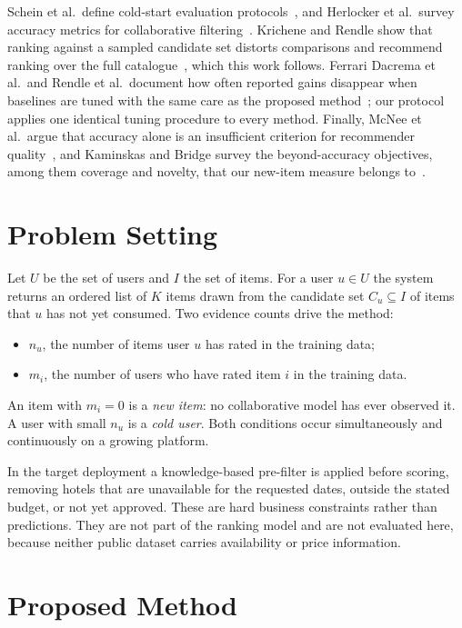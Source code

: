 \documentclass[runningheads]{llncs}
\begin{document}
Schein et al.\ define cold-start evaluation protocols~\cite{schein2002}, and Herlocker et al.\ survey accuracy metrics for collaborative filtering~\cite{herlocker2004}. Krichene and Rendle show that ranking against a sampled candidate set distorts comparisons and recommend ranking over the full catalogue~\cite{krichene2020}, which this work follows. Ferrari Dacrema et al.\ and Rendle et al.\ document how often reported gains disappear when baselines are tuned with the same care as the proposed method~\cite{dacrema2019,rendle2020}; our protocol applies one identical tuning procedure to every method. Finally, McNee et al.\ argue that accuracy alone is an insufficient criterion for recommender quality~\cite{mcnee2006}, and Kaminskas and Bridge survey the beyond-accuracy objectives, among them coverage and novelty, that our new-item measure belongs to~\cite{kaminskas2016}.

\section{Problem Setting}
\label{sec:problem}

Let $U$ be the set of users and $I$ the set of items. For a user $u \in U$ the system returns an ordered list of $K$ items drawn from the candidate set $C_u \subseteq I$ of items that $u$ has not yet consumed. Two evidence counts drive the method:
\begin{itemize}
  \item $n_u$, the number of items user $u$ has rated in the training data;
  \item $m_i$, the number of users who have rated item $i$ in the training data.
\end{itemize}
An item with $m_i = 0$ is a \emph{new item}: no collaborative model has ever observed it. A user with small $n_u$ is a \emph{cold user}. Both conditions occur simultaneously and continuously on a growing platform.

In the target deployment a knowledge-based pre-filter is applied before scoring, removing hotels that are unavailable for the requested dates, outside the stated budget, or not yet approved. These are hard business constraints rather than predictions. They are not part of the ranking model and are not evaluated here, because neither public dataset carries availability or price information.

\section{Proposed Method}
\label{sec:method}
\end{document}
